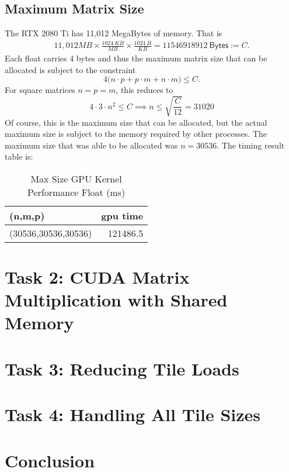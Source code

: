 \documentclass{article}
\begin{document}
\subsection{Maximum Matrix Size}
The RTX 2080 Ti has 11,012 MegaBytes of memory. That is 
\begin{align*}
    11,012 MB \times \frac{1024\ KB}{MB} \times \frac{1024\ B}{KB} = 11546918912\ \mathsf{Bytes} := C.
\end{align*}
Each float carries $4$ bytes and thus the maximum matrix size that can be allocated is subject to the constraint
$$4\big(n \cdot p + p \cdot m + n \cdot m\big) \leq C.$$
For square matrices $n = p = m$, this reduces to 
$$4 \cdot 3 \cdot n^2 \leq C \implies n \leq \sqrt{\frac{C}{12}} = 31020$$
Of course, this is the maximum size that can be allocated, but the actual maximum size is subject to the memory
required by other processes. The maximum size that was able to be allocated was $n = 30536$. 
The timing result table is:
\begin{table}[H]
    \centering
    \caption{Max Size GPU Kernel Performance Float (ms)}
    \fontsize{12}{14}\selectfont
    \begin{tabular}[t]{lr}
    \toprule
    (n,m,p) & gpu time\\
    \midrule
    (30536,30536,30536) & 121486.5\\
    \bottomrule
    \end{tabular}
\end{table}

\section{Task 2: CUDA Matrix Multiplication with Shared Memory}

\section{Task 3: Reducing Tile Loads}

\section{Task 4: Handling All Tile Sizes}

\section{Conclusion}
\end{document}
